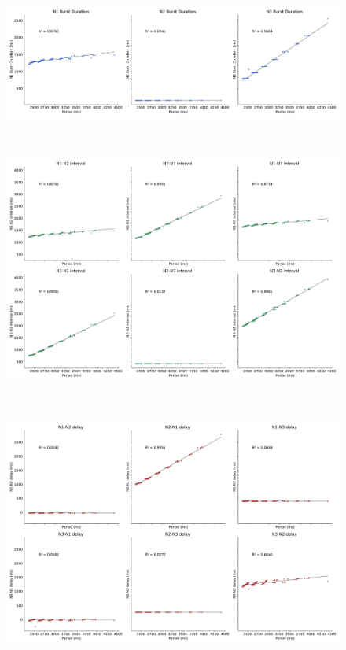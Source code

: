 \begin{figure}[hbt!]
	\begin{minipage}[b]{0.53\textwidth}
		\centering
		\begin{minipage}[b]{\textwidth}
			\centering
			\includegraphics[width=\textwidth]{invariants/data/MODEL/n1m_driven/images/3phases/_durations.pdf}
		\end{minipage}\
		\begin{minipage}[b]{\textwidth}
			\centering
			\includegraphics[width=\textwidth]{invariants/data/MODEL/n1m_driven/images/3phases/_intervals.pdf}
		\end{minipage}\
		\begin{minipage}[b]{\textwidth}
			\centering
			\includegraphics[width=\textwidth]{invariants/data/MODEL/n1m_driven/images/3phases/_delays.pdf}

\end{minipage}
\end{minipage}
\end{figure}
